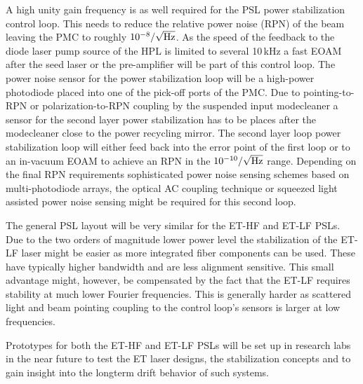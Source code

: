 A high unity gain frequency is as well required for the PSL power stabilization
control loop. This needs to reduce the relative power noise (RPN) of the beam
leaving the PMC to roughly $10^{-8} / \sqrt{\rm{Hz}}$. As the speed of the
feedback to the diode laser pump source of the HPL is limited to several 10\,kHz
a fast EOAM after the seed laser or the pre-amplifier will be part of this
control loop. The power noise sensor for the power stabilization loop will be a
high-power photodiode placed into one of the pick-off ports of the PMC. Due to
pointing-to-RPN or polarization-to-RPN coupling by the suspended input
modecleaner a sensor for the second layer power stabilization has to be places
after the modecleaner close to the power recycling mirror. The second layer loop
power stabilization loop will either feed back into the error point of the first
loop or to an in-vacuum EOAM to achieve an RPN in the $10^{-10} / \sqrt{\rm{Hz}}$ range. Depending on the final RPN requirements sophisticated
power noise sensing schemes based on multi-photodiode arrays\cite{Kwee2009}, the
optical AC coupling technique \cite{Kaufer2019} or squeezed light assisted power
noise sensing \cite{Vahlbruch2018} might be required for this second loop. 

The general PSL layout will be very similar for the ET-HF and ET-LF PSLs. Due to
the two orders of magnitude lower power level the stabilization of the ET-LF
laser might be easier as more integrated fiber components can be used. These
have typically higher bandwidth and are less alignment sensitive. This small
advantage might, however, be compensated by the fact that the ET-LF requires
stability at much lower Fourier frequencies. This is generally harder as
scattered light and beam pointing coupling to the control loop's sensors is
larger at low frequencies. 

Prototypes for both the ET-HF and ET-LF PSLs will be set up in research labs in
the near future to test the ET laser designs, the stabilization concepts and to
gain insight into the longterm drift behavior of such systems.
 